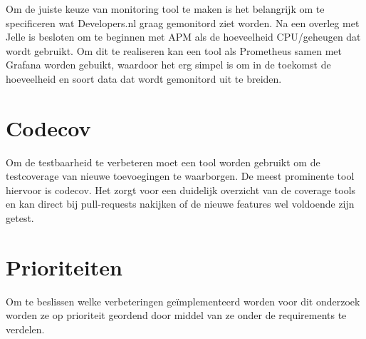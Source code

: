 Om de juiste keuze van monitoring tool te maken is het belangrijk om te specificeren wat Developers.nl graag gemonitord ziet worden. Na een overleg met Jelle is besloten om te beginnen met APM als de hoeveelheid CPU/geheugen dat wordt gebruikt. Om dit te realiseren kan een tool als Prometheus samen met Grafana worden gebuikt, waardoor het erg simpel is om in de toekomst de hoeveelheid en soort data dat wordt gemonitord uit te breiden.

\section{Codecov}
Om de testbaarheid te verbeteren moet een tool worden gebruikt om de testcoverage van nieuwe toevoegingen te waarborgen. De meest prominente tool hiervoor is codecov. Het zorgt voor een duidelijk overzicht van de coverage tools en kan direct bij pull-requests nakijken of de nieuwe features wel voldoende zijn getest.

\section{Prioriteiten}
Om te beslissen welke verbeteringen geïmplementeerd worden voor dit onderzoek worden ze op prioriteit geordend door middel van ze onder de requirements te verdelen.



